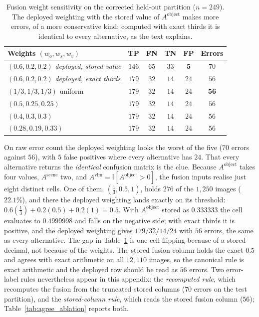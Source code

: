 \documentclass[12pt,a4paper]{report}
\begin{document}
\begin{table}[!htbp]
\centering
\caption[Fusion weight sensitivity on the corrected held-out partition ($n=249$)]{Fusion weight sensitivity on the corrected held-out partition ($n=249$). The deployed weighting with the stored value of $A^{\text{object}}$ makes more errors, of a more conservative kind; computed with exact thirds it is identical to every alternative, as the text explains.}
\label{tab:weight_sensitivity}
\small
\begin{tabular}{@{}l c c c c c@{}}
\toprule
\textbf{Weights $(w_o, w_s, w_v)$} & \textbf{TP} & \textbf{FN} & \textbf{TN} & \textbf{FP} & \textbf{Errors} \\
\midrule
$(0.6, 0.2, 0.2)$ \emph{deployed, stored value} & $146$ & $65$ & $33$ & $\mathbf{5}$ & $70$ \\
$(0.6, 0.2, 0.2)$ \emph{deployed, exact thirds} & $179$ & $32$ & $14$ & $24$ & $56$ \\
$(1/3, 1/3, 1/3)$ uniform & $179$ & $32$ & $14$ & $24$ & $\mathbf{56}$ \\
$(0.5, 0.25, 0.25)$ & $179$ & $32$ & $14$ & $24$ & $56$ \\
$(0.4, 0.3, 0.3)$ & $179$ & $32$ & $14$ & $24$ & $56$ \\
$(0.28, 0.19, 0.33)$ & $179$ & $32$ & $14$ & $24$ & $56$ \\
\bottomrule
\end{tabular}
\end{table}

On raw error count the deployed weighting looks the worst of the five ($70$ errors against $56$), with $5$ false positives where every alternative has $24$. That every alternative returns the \emph{identical} confusion matrix is the clue. Because $A^{\text{object}}$ takes four values, $A^{\text{scene}}$ two, and $A^{\text{vlm}} = \mathbb{I}[A^{\text{object}}>0]$, the fusion inputs realise just eight distinct cells. One of them, $(\tfrac13, 0.5, 1)$, holds $276$ of the $1{,}250$ images ($22.1\%$), and there the deployed weighting lands exactly on its threshold: $0.6(\tfrac13) + 0.2(0.5) + 0.2(1) = 0.5$. With $A^{\text{object}}$ stored as $0.333333$ the cell evaluates to $0.4999998$ and falls on the negative side; with exact thirds it is positive, and the deployed weighting gives $179/32/14/24$ with $56$ errors, the same as every alternative. The gap in Table~\ref{tab:weight_sensitivity} is one cell flipping because of a stored decimal, not because of the weights. The stored fusion column holds the exact $0.5$ and agrees with exact arithmetic on all $12{,}110$ images, so the canonical rule is exact arithmetic and the deployed row should be read as $56$ errors. Two error-label rules nevertheless appear in this appendix: the \emph{recomputed rule}, which recomputes the fusion from the truncated stored columns ($70$ errors on the test partition), and the \emph{stored-column rule}, which reads the stored fusion column ($56$); Table~\ref{tab:agree_ablation} reports both.
\end{document}
